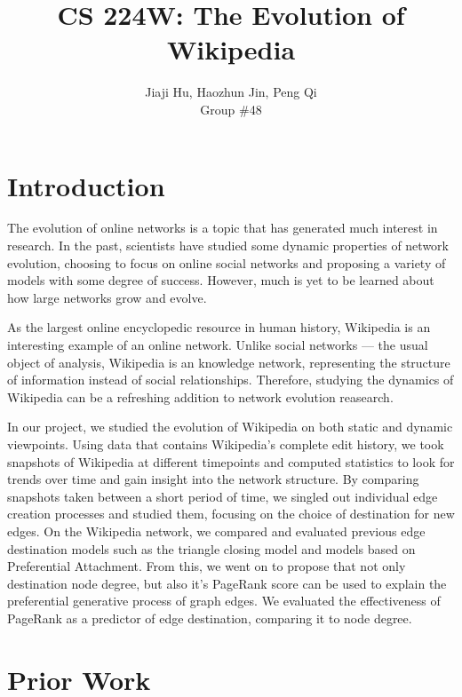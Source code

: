 \documentclass[10pt,twocolumn]{article}
\begin{document}
\title{CS 224W: The Evolution of Wikipedia}
\author{Jiaji Hu, Haozhun Jin, Peng Qi\\Group \#48}
\date{}
\maketitle

\section{Introduction}

The evolution of online networks is a topic that has generated much interest in research. In the past, scientists have studied some dynamic properties of network evolution, choosing to focus on online social networks and proposing a variety of models with some degree of success. However, much is yet to be learned about how large networks grow and evolve.

As the largest online encyclopedic resource in human history, Wikipedia is an interesting example of an online network. Unlike social networks --- the usual object of analysis, Wikipedia is an knowledge network, representing the structure of information instead of social relationships. Therefore, studying the dynamics of Wikipedia can be a refreshing addition to network evolution reasearch.

In our project, we studied the evolution of Wikipedia on both static and dynamic viewpoints. Using data that contains Wikipedia's complete edit history, we took snapshots of Wikipedia at different timepoints and computed statistics to look for trends over time and gain insight into the network structure. By comparing snapshots taken between a short period of time, we singled out individual edge creation processes and studied them, focusing on the choice of destination for new edges. On the Wikipedia network, we compared and evaluated previous edge destination models such as the triangle closing model and models based on Preferential Attachment. From this, we went on to propose that not only destination node degree, but also it's PageRank score can be used to explain the preferential generative process of graph edges. We evaluated the effectiveness of PageRank as a predictor of edge destination, comparing it to node degree.
\section{Prior Work}
\end{document}
